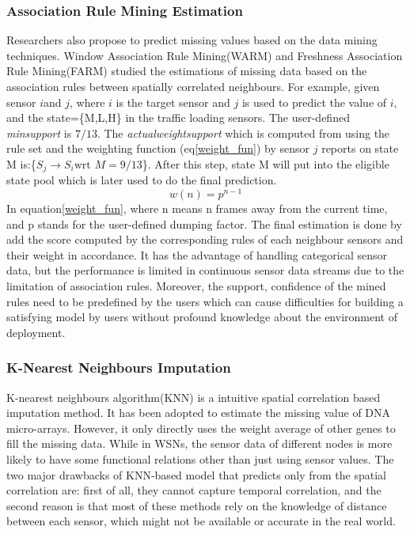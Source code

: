 \subsubsection{Association Rule Mining Estimation}
 Researchers also propose to predict missing values based on the data mining techniques. Window Association Rule Mining(WARM)\cite{Gruenwald:WARM} and Freshness Association Rule Mining(FARM)\cite{Gruenwald:FARM} studied the estimations of missing data based on the association rules between spatially correlated neighbours. For example, given sensor $i$and $j$, where $i$ is the target sensor and $j$ is used to predict the value of $i$, and the state=\{M,L,H\} in the traffic loading sensors. The user-defined \textit{minsupport} is $7/13$. The \textit{actualweightsupport} which is computed from using the rule set and the weighting function (eq\ref{weight_fun}) by sensor $j$ reports on state M is:\{$S_{j} \rightarrow S_{i} \mbox{wrt }  M = 9/13$\}. After  this step, state M will put into the eligible state pool which is later used to do the final prediction. 
 \begin{equation}
 w(n) = p^{n-1}
 \label{weight_fun}
\end{equation}
In equation\ref{weight_fun},  where n means n frames away from the current time, and p stands for the user-defined dumping factor. The final estimation is done by add the score computed by the corresponding rules of each neighbour sensors and their weight in accordance.
 It has the advantage of handling categorical sensor data, but the performance is limited in continuous sensor data streams due to the limitation of association rules. Moreover, the support, confidence of the mined rules need to be predefined by the users which can cause difficulties for building a satisfying model by users without profound knowledge about the environment of deployment. 
\subsubsection{K-Nearest Neighbours Imputation} 
 K-nearest neighbours algorithm(KNN) is a intuitive spatial correlation based imputation method. It has been adopted to estimate the missing value of DNA micro-arrays\cite{Troyanskaya:DNAKNN}. However, it only directly uses the weight average of other genes to fill the missing data. While in WSNs, the sensor data of different nodes is more likely to have some functional relations other than just using sensor values. The two major drawbacks of KNN-based model that predicts only from the spatial correlation are: first of all,  they cannot capture temporal correlation, and the second reason is that most of these methods rely on the knowledge of distance between each sensor, which might not be available or accurate in the real world.
